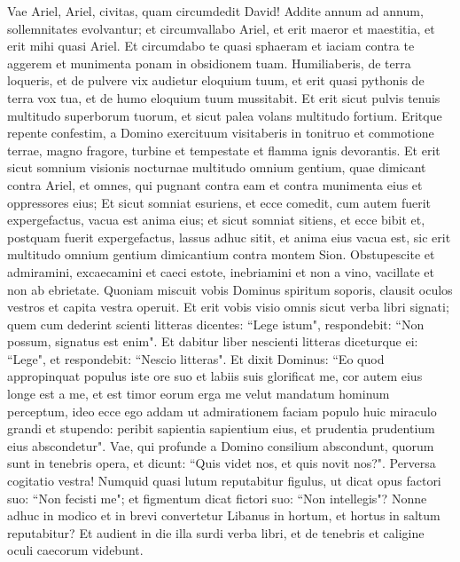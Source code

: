 \begin{biblechapter}  
\verse Vae Ariel, Ariel, civitas, quam circumdedit David! Addite annum ad annum, sollemnitates evolvantur; 
\verse et circumvallabo Ariel, et erit maeror et maestitia, et erit mihi quasi Ariel. 
\verse Et circumdabo te quasi sphaeram et iaciam contra te aggerem et munimenta ponam in obsidionem tuam. 
\verse Humiliaberis, de terra loqueris, et de pulvere vix audietur eloquium tuum, et erit quasi pythonis de terra vox tua, et de humo eloquium tuum mussitabit. 
\verse Et erit sicut pulvis tenuis multitudo superborum tuorum, et sicut palea volans multitudo fortium. Eritque repente confestim, 
\verse a Domino exercituum visitaberis in tonitruo et commotione terrae, magno fragore, turbine et tempestate et flamma ignis devorantis. 
\verse Et erit sicut somnium visionis nocturnae multitudo omnium gentium, quae dimicant contra Ariel, et omnes, qui pugnant contra eam et contra munimenta eius et oppressores eius; 
\verse Et sicut somniat esuriens, et ecce comedit, cum autem fuerit expergefactus, vacua est anima eius; et sicut somniat sitiens, et ecce bibit et, postquam fuerit expergefactus, lassus adhuc sitit, et anima eius vacua est, sic erit multitudo omnium gentium dimicantium contra montem Sion. 
\verse Obstupescite et admiramini, excaecamini et caeci estote, inebriamini et non a vino, vacillate et non ab ebrietate. 
\verse Quoniam miscuit vobis Dominus spiritum soporis, clausit oculos vestros et capita vestra operuit. 
\verse Et erit vobis visio omnis sicut verba libri signati; quem cum dederint scienti litteras dicentes: “Lege istum", respondebit: “Non possum, signatus est enim". 
\verse Et dabitur liber nescienti litteras diceturque ei: “Lege", et respondebit: “Nescio litteras". 
\verse Et dixit Dominus: “Eo quod appropinquat populus iste ore suo et labiis suis glorificat me, cor autem eius longe est a me, et est timor eorum erga me velut mandatum hominum perceptum, 
\verse ideo ecce ego addam ut admirationem faciam populo huic miraculo grandi et stupendo: peribit sapientia sapientium eius, et prudentia prudentium eius abscondetur". 
\verse Vae, qui profunde a Domino consilium abscondunt, quorum sunt in tenebris opera, et dicunt: “Quis videt nos, et quis novit nos?". 
\verse Perversa cogitatio vestra! Numquid quasi lutum reputabitur figulus, ut dicat opus factori suo: “Non fecisti me"; et figmentum dicat fictori suo: “Non intellegis"? 
\verse Nonne adhuc in modico et in brevi convertetur Libanus in hortum, et hortus in saltum reputabitur? 
\verse Et audient in die illa surdi verba libri, et de tenebris et caligine oculi caecorum videbunt. 

\end{biblechapter}
